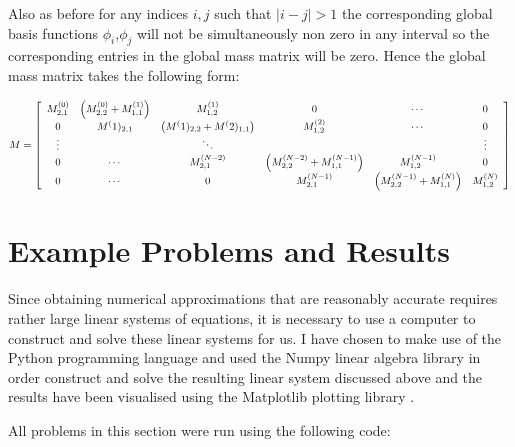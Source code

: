 Also as before for any indices $i,j$ such that $|i - j| > 1$ the corresponding
global basis functions $\phi_i$,$\phi_j$ will not be simultaneously non zero in
any interval so the corresponding entries in the global mass matrix will be
zero. Hence the global mass matrix takes the following form:

\begin{equation}\label{eq:oned-deterministic-global-mass}
    M = \left[\begin{array}{c c c c c c}
            M^{(0)}_{2,1} & \left(M^{(0)}_{2,2} + M^{(1)}_{1,1}\right) & M^{(1)}_{1,2} & 0 & \cdots & 0 \\
            0 & M^(1)_{2,1} & \left(M^(1)_{2,2} + M^(2)_{1,1}\right) & M^{(2)}_{1,2} & \cdots & 0 \\
            \vdots & & \ddots & & & \vdots \\
            0 & \cdots & M^{(N-2)}_{2,1} & \left(M^{(N-2)}_{2,2} + M^{(N-1)}_{1,1}\right) & M^{(N-1)}_{1,2} & 0  \\
            0 &\cdots & 0 & M^{(N-1)}_{2,1} & \left(M^{(N-1)}_{2,2} + M^{(N)}_{1,1}\right) & M^{(N)}_{1,2}
        \end{array}\right]
\end{equation}


\section{Example Problems and Results}

Since obtaining numerical approximations that are reasonably accurate requires
rather large linear systems of equations, it is necessary to use a computer to
construct and solve these linear systems for us.  I have chosen to make use of
the Python programming language and used the Numpy linear algebra library
\cite{numpy-array} in order construct and solve the resulting linear system
discussed above  and the results have been
visualised using the Matplotlib plotting library \cite{matplotlib}.

All problems in this section were run using the following code:




